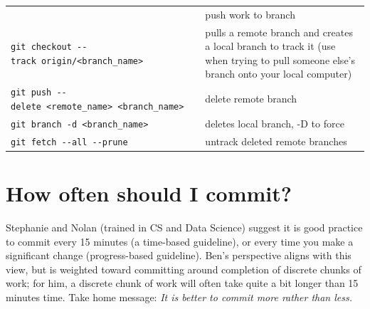 \documentclass[]{book}
\begin{document}
\begin{longtable}[]{@{}ll@{}}
\begin{minipage}[t]{0.34\columnwidth}
\end{minipage} & \begin{minipage}[t]{0.60\columnwidth}\raggedright
push work to branch\strut
\end{minipage}\tabularnewline
\begin{minipage}[t]{0.34\columnwidth}\raggedright
\texttt{git\ checkout\ -\/-track\ origin/\textless{}branch\_name\textgreater{}}\strut
\end{minipage} & \begin{minipage}[t]{0.60\columnwidth}\raggedright
pulls a remote branch and creates a local branch to track it (use when trying to pull someone else's branch onto your local computer)\strut
\end{minipage}\tabularnewline
\begin{minipage}[t]{0.34\columnwidth}\raggedright
\texttt{git\ push\ -\/-delete\ \textless{}remote\_name\textgreater{}\ \textless{}branch\_name\textgreater{}}\strut
\end{minipage} & \begin{minipage}[t]{0.60\columnwidth}\raggedright
delete remote branch\strut
\end{minipage}\tabularnewline
\begin{minipage}[t]{0.34\columnwidth}\raggedright
\texttt{git\ branch\ -d\ \textless{}branch\_name\textgreater{}}\strut
\end{minipage} & \begin{minipage}[t]{0.60\columnwidth}\raggedright
deletes local branch, -D to force\strut
\end{minipage}\tabularnewline
\begin{minipage}[t]{0.34\columnwidth}\raggedright
\texttt{git\ fetch\ -\/-all\ -\/-prune}\strut
\end{minipage} & \begin{minipage}[t]{0.60\columnwidth}\raggedright
untrack deleted remote branches\strut
\end{minipage}\tabularnewline
\bottomrule
\end{longtable}

\hypertarget{how-often-should-i-commit}{%
\section{How often should I commit?}\label{how-often-should-i-commit}}

Stephanie and Nolan (trained in CS and Data Science) suggest it is good practice to commit every 15 minutes (a time-based guideline), or every time you make a significant change (progress-based guideline). Ben's perspective aligns with this view, but is weighted toward committing around completion of discrete chunks of work; for him, a discrete chunk of work will often take quite a bit longer than 15 minutes time. Take home message: \emph{It is better to commit more rather than less.}
\end{document}
